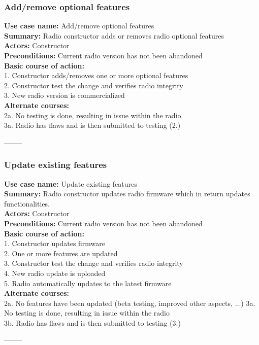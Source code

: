\documentclass[11pt]{article}
\begin{document}
\subsubsection{Add/remove optional features}
\textbf{Use case name:} Add/remove optional features\\
\textbf{Summary:} Radio constructor adds or removes radio optional features\\
\textbf{Actors:} Constructor\\
\textbf{Preconditions:} Current radio version has not been abandoned\\
\textbf{Basic course of action:}\\
1. Constructor adds/removes one or more optional features\\
2. Constructor test the change and verifies radio integrity\\
3. New radio version is commercialized\\
\textbf{Alternate courses:}\\
2a. No testing is done, resulting in issue within the radio\\
3a. Radio has flaws and is then submitted to testing (2.)
\begin{center}--------\end{center}

\subsubsection{Update existing features}
\textbf{Use case name:} Update existing features\\
\textbf{Summary:} Radio constructor updates radio firmware which in return updates functionalities.\\
\textbf{Actors:} Constructor\\
\textbf{Preconditions:} Current radio version has not been abandoned\\
\textbf{Basic course of action:}\\
1. Constructor updates firmware\\
2. One or more features are updated\\
3. Constructor test the change and verifies radio integrity\\
4. New radio update is uploaded\\
5. Radio automatically updates to the latest firmware\\
\textbf{Alternate courses:}\\
2a. No features have been updated (beta testing, improved other aspects, ...)
3a. No testing is done, resulting in issue within the radio\\
3b. Radio has flaws and is then submitted to testing (3.)\\
\begin{center}--------\end{center}
\end{document}
